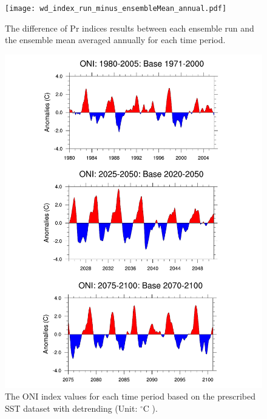 \documentclass{ametsoc}
\begin{document}
\clearpage
 
\begin{figure}
\begin{center}
\texttt{[image: wd\_index\_run\_minus\_ensembleMean\_annual.pdf]}
\caption{The difference of Pr indices results between each ensemble run and the ensemble mean averaged annually for each time period.}
\label{fig:S1}
\end{center}
\end{figure}
%
\begin{figure}
\begin{center}
\includegraphics[width=6in]{indices_oni.pdf}
\caption{The ONI index values for each time period based on the prescribed SST dataset with detrending (Unit: $^\circ$C ).}
\end{center}
\label{fig:S2}
\end{figure}
\end{document}

